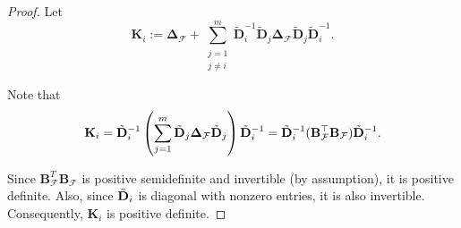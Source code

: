 \documentclass[journal,draftcls,onecolumn]{IEEEtran}
\theoremstyle{mystyle}
\newcommand{\bfD}{\mathbf{D}}
\begin{document}
\begin{proof}


Let
\begin{equation}\label{K_i}
\mathbf{K}_i := \mathbf{\Delta}_{\mathcal{F}}  +  \sum_{\substack{j = 1 \\ j \neq i}}^m\tilde{\bfD}^{-1}_i\tilde{\bfD}_j\mathbf{\Delta}_{\mathcal{F}}\tilde{\bfD}_j\tilde{\bfD}^{-1}_i.\end{equation}

Note that
\[
\mathbf{K}_i
= \tilde{\bf D}_i^{-1}
\left(\sum_{j=1}^m \tilde{\bf D}_j \mathbf{\Delta}_{\mathcal{F}} \tilde{\bf D}_j\right)
\tilde{\bf D}_i^{-1}
= \tilde{\bf D}_i^{-1}
(\mathbf{B}_{\mathcal{F}}^{\top}\mathbf{B}_{\mathcal{F}})
\tilde{\bf D}_i^{-1}.
\]

Since $\mathbf{B}_{\mathcal{F}}^{T}\mathbf{B}_{\mathcal{F}}$ is positive semidefinite and invertible (by assumption), it is positive definite. Also, since $\tilde{\bf D}_i$ is diagonal with nonzero entries, it is also invertible. Consequently,
$\mathbf{K}_i$ is positive definite. 






\end{proof}
\end{document}
